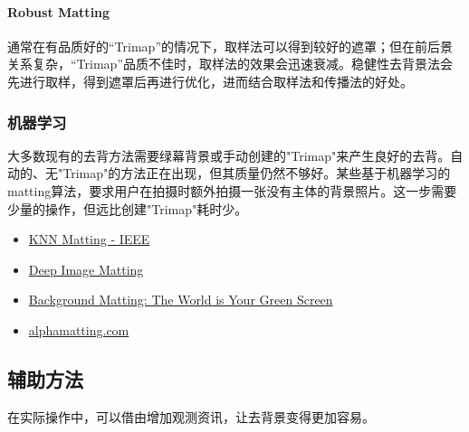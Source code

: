 \documentclass[scheme=chinese,a4paper]{article}
\begin{document}
\paragraph{Robust Matting}
通常在有品质好的“Trimap”的情况下，取样法可以得到较好的遮罩；但在前后景关系复杂，“Trimap”品质不佳时，取样法的效果会迅速衰减。稳健性去背景法会先进行取样，得到遮罩后再进行优化，进而结合取样法和传播法的好处。
\subsubsection{机器学习}
大多数现有的去背方法需要绿幕背景或手动创建的"Trimap"来产生良好的去背。自动的、无"Trimap"的方法正在出现，但其质量仍然不够好。某些基于机器学习的matting算法，要求用户在拍摄时额外拍摄一张没有主体的背景照片。这一步需要少量的操作，但远比创建"Trimap"耗时少。
\begin{itemize}
  \item \href{https://ieeexplore.ieee.org/document/6409354}{KNN Matting - IEEE}
  \item \href{https://arxiv.org/abs/1703.03872}{Deep Image Matting}
  \item \href{https://github.com/senguptaumd/Background-Matting}{Background Matting: The World is Your Green Screen}
  \item \href{http://alphamatting.com/}{alphamatting.com}
\end{itemize}
\subsection{辅助方法}
在实际操作中，可以借由增加观测资讯，让去背景变得更加容易。
\end{document}
